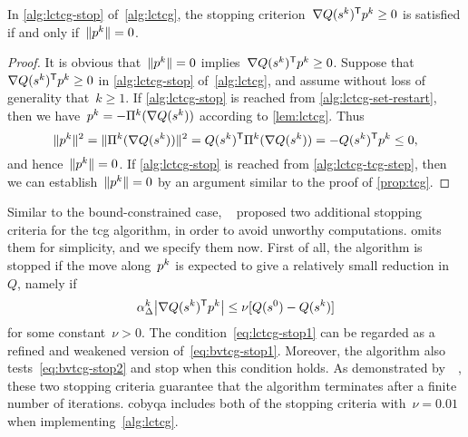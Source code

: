 
\begin{proposition}
    \label{prop:lctcg}
    In \cref{alg:lctcg-stop} of~\cref{alg:lctcg}, the stopping criterion~$\nabla Q (\sstep[k])^{\T} \pstep[k] \ge 0$ is satisfied if and only if~$\norm{\pstep[k]} = 0$.
\end{proposition}

\begin{proof}
    It is obvious that~$\norm{\pstep[k]} = 0$ implies~$\nabla Q (\sstep[k])^{\T} \pstep[k] \ge 0$.
    Suppose that~$\nabla Q (\sstep[k])^{\T} \pstep[k] \ge 0$ in \cref{alg:lctcg-stop} of~\cref{alg:lctcg}, and assume without loss of generality that~$k \ge 1$.
    If \cref{alg:lctcg-stop} is reached from \cref{alg:lctcg-set-restart}, then we have~$\pstep[k] = -\Pi^k(\nabla Q(\sstep[k]))$ according to \cref{lem:lctcg}.
    Thus
    \begin{equation*}
        \norm{\pstep[k]}^2 = \norm{\Pi^k(\nabla Q(\sstep[k]))}^2 = Q (\sstep[k])^{\T}  \Pi^k(\nabla Q(\sstep[k])) = - Q (\sstep[k])^{\T}  \pstep[k] \le 0,
    \end{equation*}
    and hence~$\norm{\pstep[k]} = 0$.
    If \cref{alg:lctcg-stop} is reached from \cref{alg:lctcg-tcg-step}, then we can establish~$\norm{\pstep[k]} = 0$ by an argument similar to the proof of \cref{prop:tcg}.
\end{proof}

Similar to the bound-constrained case, ~\cite[\S~2]{Powell_2015} proposed two additional stopping criteria for the \gls{tcg} algorithm, in order to avoid unworthy computations.
 omits them for simplicity, and we specify them now.
First of all, the algorithm is stopped if the move along~$\pstep[k]$ is expected to give a relatively small reduction in~$Q$, namely if
\begin{equation}
    \label{eq:lctcg-stop1}
    \alpha_{\rad}^k \abs[\big]{\nabla Q(\sstep[k])^{\T} \pstep[k]} \le \nu [Q(\sstep[0]) - Q(\sstep[k])]
\end{equation}
for some constant~$\nu > 0$. The condition~\cref{eq:lctcg-stop1} can be regarded as a refined and weakened version of~\cref{eq:bvtcg-stop1}.
Moreover, the algorithm also tests~\cref{eq:bvtcg-stop2} and stop when this condition holds.
As demonstrated by~\citeauthor{Powell_2015}~\cite[\S~5]{Powell_2015}, these two stopping criteria guarantee that the algorithm terminates after a finite number of iterations.
\Gls{cobyqa} includes both of the stopping criteria with~$\nu = 0.01$ when implementing~\cref{alg:lctcg}.

